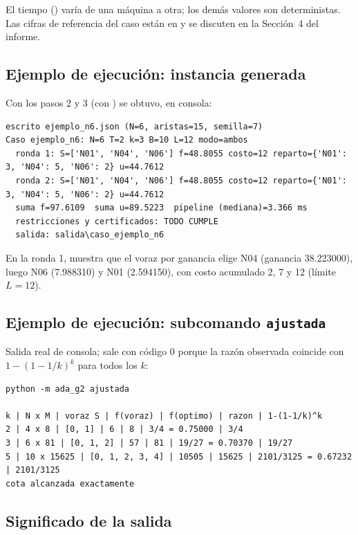 \documentclass[11pt,a4paper]{article}
\begin{document}
El tiempo () varía de una máquina a otra; los demás valores son deterministas. Las cifras de referencia del caso están en  y se discuten en la Sección~4 del informe.

\subsection{Ejemplo de ejecución: instancia generada}

Con los pasos 2 y 3 (con ) se obtuvo, en consola:

\begin{lstlisting}
escrito ejemplo_n6.json (N=6, aristas=15, semilla=7)
Caso ejemplo_n6: N=6 T=2 k=3 B=10 L=12 modo=ambos
  ronda 1: S=['N01', 'N04', 'N06'] f=48.8055 costo=12 reparto={'N01': 3, 'N04': 5, 'N06': 2} u=44.7612
  ronda 2: S=['N01', 'N04', 'N06'] f=48.8055 costo=12 reparto={'N01': 3, 'N04': 5, 'N06': 2} u=44.7612
  suma f=97.6109  suma u=89.5223  pipeline (mediana)=3.366 ms
  restricciones y certificados: TODO CUMPLE
  salida: salida\caso_ejemplo_n6
\end{lstlisting}

En la ronda 1,  muestra que el voraz por ganancia elige N04 (ganancia 38.223000), luego N06 (7.988310) y N01 (2.594150), con costo acumulado 2, 7 y 12 (límite $L=12$).

\subsection{Ejemplo de ejecución: subcomando \texttt{ajustada}}

Salida real de consola; sale con código 0 porque la razón observada coincide con $1-(1-1/k)^k$ para todos los $k$:

\begin{lstlisting}
python -m ada_g2 ajustada

k | N x M | voraz S | f(voraz) | f(optimo) | razon | 1-(1-1/k)^k
2 | 4 x 8 | [0, 1] | 6 | 8 | 3/4 = 0.75000 | 3/4
3 | 6 x 81 | [0, 1, 2] | 57 | 81 | 19/27 = 0.70370 | 19/27
5 | 10 x 15625 | [0, 1, 2, 3, 4] | 10505 | 15625 | 2101/3125 = 0.67232 | 2101/3125
cota alcanzada exactamente
\end{lstlisting}

\subsection{Significado de la salida}\label{sec:salida}
\end{document}
